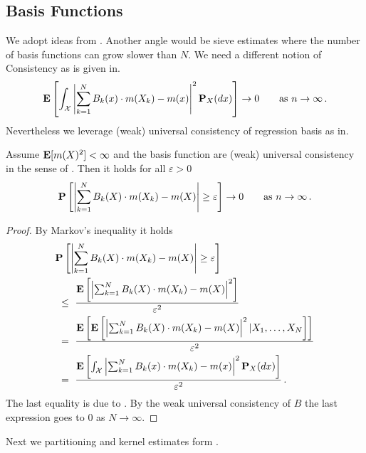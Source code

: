 \subsection*{Basis Functions}
We adopt ideas from \cite{Gyorfi2002}. Another angle would be sieve estimates\cite{Newey1997a} where the number of basis functions can grow slower than $N$.
We need a different notion of
Consistency as is given 
in\cite[Definitien~1.1]{Gyorfi2002}.
\begin{gather}
  \E
  \left[ 
    \int_\mathcal{X}
    \left| 
    \sum_{k=1}^{N} 
    B_k(x)
    \cdot
    m(X_k)
    -
    m(x)
    \right|
    ^2
    \P_X(dx)
  \right]
  \to
  0
  \qquad
  \text{as}
  \ 
  n\to \infty
  \,.
\end{gather}
Nevertheless we leverage (weak) universal consistency 
of regression basis as
in\cite[Definitien~1.3]{Gyorfi2002}.
\begin{theorem}
  Assume
  $\mathbf{E}[m(X)^2]<\infty$
  and the basis function are 
(weak) universal consistency in the sense of 
\cite[Definitien~1.3]{Gyorfi2002}.
Then it holds for all $\varepsilon>0$
\begin{gather}
  \P
  \left[ 
    \left| 
    \sum_{k=1}^{N} 
    B_k(X)
    \cdot
    m(X_k)
    -
    m(X)
    \right|
    \ge
    \varepsilon
  \right]
  \to
  0
  \qquad
  \text{as}
  \ 
  n\to \infty
  \,.
\end{gather}
\end{theorem}
\begin{proof}
  By Markov's inequality it holds
  \begin{align*}
    &
  \P
  \left[ 
    \left| 
    \sum_{k=1}^{N} 
    B_k(X)
    \cdot
    m(X_k)
    -
    m(X)
    \right|
    \ge
    \varepsilon
  \right]
  \\
  &
  \ 
  \le
  \ 
  \frac
  {
  \E
  \left[ 
    \left| 
    \sum_{k=1}^{N} 
    B_k(X)
    \cdot
    m(X_k)
    -
    m(X)
    \right|
    ^2
  \right]
  }
  {\varepsilon^2}
  \\
  &
  \ 
  =
  \ 
  \frac
  {
  \E
  \left[ 
    \E
    \left[ 
    \left| 
    \sum_{k=1}^{N} 
    B_k(X)
    \cdot
    m(X_k)
    -
    m(X)
    \right|
    ^2
    |
    X_1,
    \ldots,
    X_N
    \right]
  \right]
  }
  {\varepsilon^2}
  \\
  &
  \ 
  =
  \ 
  \frac
  {
  \E
  \left[ 
    \int_\mathcal{X}
    \left| 
    \sum_{k=1}^{N} 
    B_k(x)
    \cdot
    m(X_k)
    -
    m(x)
    \right|
    ^2
    \P_X(dx)
  \right]
  }
  {\varepsilon^2}
  \,.
  \end{align*}
  The last equality is due to \cite[(1.2)]{Gyorfi2002}.
  By the weak universal consistency of $B$
  the last expression goes to $0$ as $N\to \infty$.
\end{proof}
Next we partitioning and kernel estimates form \cite[§4,§5]{Gyorfi2002}.

